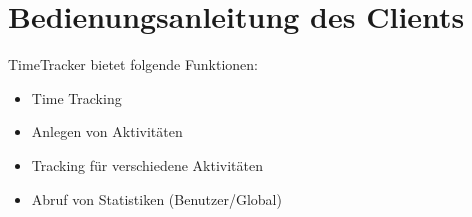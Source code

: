 
\section{Bedienungsanleitung des Clients}

TimeTracker bietet folgende Funktionen:
\begin{itemize}
	\item Time Tracking
	\item Anlegen von Aktivitäten %
	\item Tracking für verschiedene Aktivitäten
	\item Abruf von Statistiken (Benutzer/Global)
\end{itemize}